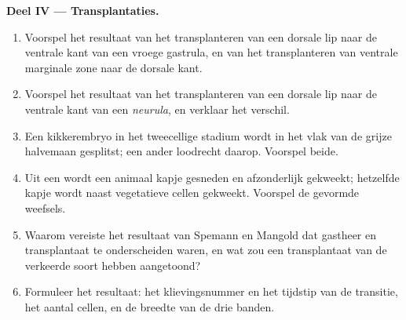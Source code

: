 \begin{problem}
\medskip
\noindent\textbf{Deel IV --- Transplantaties.}
\begin{enumerate}[resume]
  \item Voorspel het resultaat van het transplanteren van een dorsale lip
        naar de ventrale kant van een vroege gastrula, en van het
        transplanteren van ventrale marginale zone naar de dorsale kant.
  \item Voorspel het resultaat van het transplanteren van een dorsale lip
        naar de ventrale kant van een \emph{neurula}, en verklaar het verschil.
  \item Een kikkerembryo in het tweecellige stadium wordt in het vlak van
        de grijze halvemaan gesplitst; een ander loodrecht daarop. Voorspel
        beide.
  \item Uit een  wordt een animaal kapje gesneden en afzonderlijk
        gekweekt; hetzelfde kapje wordt naast vegetatieve cellen gekweekt.
        Voorspel de gevormde weefsels.
  \item Waarom vereiste het resultaat van Spemann en Mangold dat gastheer en
        transplantaat te onderscheiden waren, en wat zou een transplantaat
        van de verkeerde soort hebben aangetoond?
  \item Formuleer het resultaat: het klievingsnummer en het tijdstip van de
        transitie, het aantal cellen, en de breedte van de drie banden.
\end{enumerate}
\end{problem}
